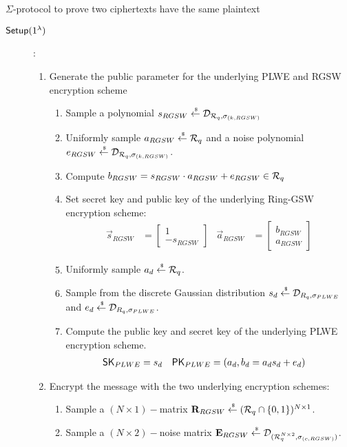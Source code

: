 \begin{section}{$\Sigma$-protocol to prove two ciphertexts have the same plaintext~\label{ProofSamePlaintext}}
  \begin{description}
    \item [${\mathsf{Setup}}(1^\lambda)$]:
    \begin{enumerate}
      \item Generate the public parameter for the underlying PLWE and RGSW encryption scheme
      \begin{enumerate}
        \item Sample a polynomial $s_{RGSW} \stackrel{{\scriptscriptstyle \mkern4mu \$}}{\gets} \mathcal{D}_{{\mathcal{R}}_q, \sigma_{(k,RGSW)}}$
        \item Uniformly sample $a_{RGSW} \stackrel{{\scriptscriptstyle \mkern4mu \$}}{\gets} {\mathcal{R}}_q$ and a noise polynomial $e_{RGSW} \stackrel{{\scriptscriptstyle \mkern4mu \$}}{\gets} \mathcal{D}_{{\mathcal{R}}_q, \sigma_{(k, RGSW)}}$.
        \item Compute $b_{RGSW} = s_{RGSW} \cdot a_{RGSW} + e_{RGSW} \in {\mathcal{R}}_q$
        \item Set secret key and public key of the underlying Ring-GSW encryption scheme:
          \begin{align*}
            \vec{s}_{RGSW} &= \begin{bmatrix} 1 \\ -s_{RGSW} \end{bmatrix}  & \vec{a}_{RGSW} &=  \begin{bmatrix} b_{RGSW} \\ a_{RGSW}\end{bmatrix}
          \end{align*}
        \item Uniformly sample $a_d \stackrel{{\scriptscriptstyle \mkern4mu \$}}{\gets} {\mathcal{R}}_q$.
        \item Sample from the discrete Gaussian distribution $s_d \stackrel{{\scriptscriptstyle \mkern4mu \$}}{\gets} \mathcal{D}_{R_q, \sigma_{PLWE}}$ and $e_d \stackrel{{\scriptscriptstyle \mkern4mu \$}}{\gets} \mathcal{D}_{R_q, \sigma_{PLWE}}$.
        \item Compute the public key and secret key of the underlying PLWE encryption scheme.
        \begin{align*}
          \mathsf{SK}_{PLWE} &= s_d & \mathsf{PK}_{PLWE} &= (a_d, b_d = a_d s_d + e_d)
        \end{align*}
      \end{enumerate}
      \item Encrypt the message with the two underlying encryption schemes:
        \begin{enumerate}
        \item Sample a $(N \times 1)-$matrix $\mathbf{R}_{RGSW} \stackrel{{\scriptscriptstyle \mkern4mu \$}}{\gets} ({\mathcal{R}}_q \cap\{0,1\})^{N \times 1}$.
        \item Sample a $(N \times 2)-$noise matrix $\mathbf{E}_{RGSW} \stackrel{{\scriptscriptstyle \mkern4mu \$}}{\gets} \mathcal{D}_{({\mathcal{R}}_q^{N \times 2}, \sigma_{(c, RGSW)})}$.

\end{enumerate}
\end{enumerate}
\end{description}
\end{section}
